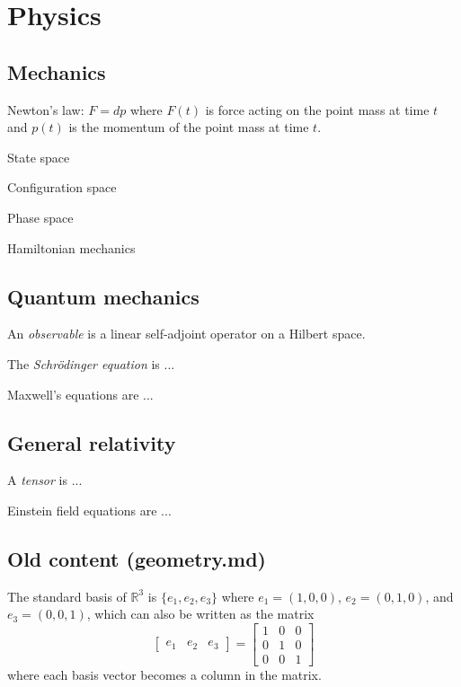 \chapter{Physics}

\section{Mechanics}

Newton's law:
\(F = dp\) where \(F(t)\) is force acting on the point mass at time \(t\)
and \(p(t)\) is the momentum of the point mass at time \(t\).

State space

Configuration space

Phase space

Hamiltonian mechanics

\section{Quantum mechanics}

%
An \emph{observable} is a linear self-adjoint operator on a Hilbert space.

%
The \emph{Schr\"odinger equation} is ...

%
Maxwell's equations are ...

\section{General relativity}

%
A \emph{tensor} is ...

%
Einstein field equations are ...

\section{Old content (geometry.md)}

The standard basis of $\mathbb{R}^3$
is $\{e_1,e_2,e_3\}$
where $e_1 = (1,0,0)$, $e_2 = (0,1,0)$, and $e_3 = (0,0,1)$,
which can also be written as the matrix
\[
\begin{bmatrix}e_1&e_2&e_3\end{bmatrix}
= \begin{bmatrix}1&0&0\\0&1&0\\0&0&1\end{bmatrix}
\]
where each basis vector becomes a column in the matrix.

